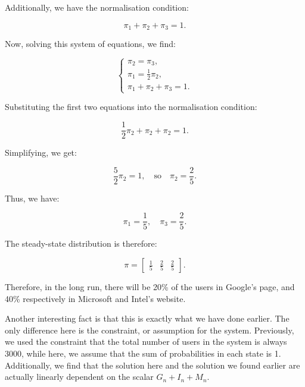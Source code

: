 \documentclass[12pt,a4paper]{article}
\begin{document}
\begin{remark}
Additionally, we have the normalisation condition:

\[
\pi_1 + \pi_2 + \pi_3 = 1.
\]

Now, solving this system of equations, we find:

\[
\begin{cases}
\pi_2 = \pi_3, \\
\pi_1 = \frac{1}{2}\pi_2, \\
\pi_1 + \pi_2 + \pi_3 = 1.
\end{cases}
\]

Substituting the first two equations into the normalisation condition:

\[
\frac{1}{2}\pi_2 + \pi_2 + \pi_2 = 1.
\]

Simplifying, we get:

\[
\frac{5}{2}\pi_2 = 1, \quad \text{so} \quad \pi_2 = \frac{2}{5}.
\]

Thus, we have:

\[
\pi_1 = \frac{1}{5}, \quad \pi_3 = \frac{2}{5}.
\]

The steady-state distribution is therefore:

\[
\pi = \begin{bmatrix} \frac{1}{5} & \frac{2}{5} & \frac{2}{5} \end{bmatrix}.
\]

Therefore, in the long run, there will be 20\% of the users in Google's page, and 40\% respectively in Microsoft and Intel's website.

Another interesting fact is that this is exactly what we have done earlier. The only difference here is the constraint, or assumption for the system. Previously, we used the constraint that the total number of users in the system is always 3000, while here, we assume that the sum of probabilities in each state is 1. Additionally, we find that the solution here and the solution we found earlier are actually linearly dependent on the scalar \(G_n + I_n + M_n\).
\end{remark}
\end{document}
